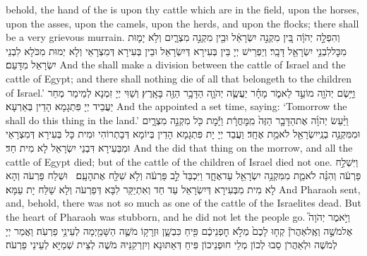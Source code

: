 {behold, the hand of the \lord\space is upon thy cattle which are in the field, upon the horses, upon the asses, upon the camels, upon the herds, and upon the flocks; there shall be a very grievous murrain.}{}
{וְהִפְלָ֣ה יְהֹוָ֔ה בֵּ֚ין מִקְנֵ֣ה יִשְׂרָאֵ֔ל וּבֵ֖ין מִקְנֵ֣ה מִצְרָ֑יִם וְלֹ֥א יָמ֛וּת מִכׇּל\maqqaf לִבְנֵ֥י יִשְׂרָאֵ֖ל דָּבָֽר׃}
{וְיַפְרֵישׁ יְיָ בֵּין בְּעִירָא דְּיִשְׂרָאֵל וּבֵין בְּעִירָא דְּמִצְרָאֵי וְלָא יְמוּת מִכֹּלָא לִבְנֵי יִשְׂרָאֵל מִדָּעַם׃}
{And the \lord\space shall make a division between the cattle of Israel and the cattle of Egypt; and there shall nothing die of all that belongeth to the children of Israel.’}{}
{וַיָּ֥שֶׂם יְהֹוָ֖ה מוֹעֵ֣ד לֵאמֹ֑ר מָחָ֗ר יַעֲשֶׂ֧ה יְהֹוָ֛ה הַדָּבָ֥ר הַזֶּ֖ה בָּאָֽרֶץ׃}
{וְשַׁוִּי יְיָ זִמְנָא לְמֵימַר מְחַר יַעֲבֵיד יְיָ פִּתְגָמָא הָדֵין בְּאַרְעָא׃}
{And the \lord\space appointed a set time, saying: ‘Tomorrow the \lord\space shall do this thing in the land.’}{}
{וַיַּ֨עַשׂ יְהֹוָ֜ה אֶת\maqqaf הַדָּבָ֤ר הַזֶּה֙ מִֽמׇּחֳרָ֔ת וַיָּ֕מׇת כֹּ֖ל מִקְנֵ֣ה מִצְרָ֑יִם וּמִמִּקְנֵ֥ה בְנֵֽי\maqqaf יִשְׂרָאֵ֖ל לֹא\maqqaf מֵ֥ת אֶחָֽד׃}
{וַעֲבַד יְיָ יָת פִּתְגָמָא הָדֵין בְּיוֹמָא דְּבָתְרוֹהִי וּמִית כָּל בְּעִירָא דְּמִצְרָאֵי וּמִבְּעִירָא דִּבְנֵי יִשְׂרָאֵל לָא מִית חַד׃}
{And the \lord\space did that thing on the morrow, and all the cattle of Egypt died; but of the cattle of the children of Israel died not one.}{}
{וַיִּשְׁלַ֣ח פַּרְעֹ֔ה וְהִנֵּ֗ה לֹא\maqqaf מֵ֛ת מִמִּקְנֵ֥ה יִשְׂרָאֵ֖ל עַד\maqqaf אֶחָ֑ד וַיִּכְבַּד֙ לֵ֣ב פַּרְעֹ֔ה וְלֹ֥א שִׁלַּ֖ח אֶת\maqqaf הָעָֽם׃ \petucha }
{וּשְׁלַח פַּרְעֹה וְהָא לָא מִית מִבְּעִירָא דְּיִשְׂרָאֵל עַד חַד וְאִתְיַקַּר לִבָּא דְּפַרְעֹה וְלָא שַׁלַּח יָת עַמָּא׃}
{And Pharaoh sent, and, behold, there was not so much as one of the cattle of the Israelites dead. But the heart of Pharaoh was stubborn, and he did not let the people go.}{}
{וַיֹּ֣אמֶר יְהֹוָה֮ אֶל\maqqaf מֹשֶׁ֣ה וְאֶֽל\maqqaf אַהֲרֹן֒ קְח֤וּ לָכֶם֙ מְלֹ֣א חׇפְנֵיכֶ֔ם פִּ֖יחַ כִּבְשָׁ֑ן וּזְרָק֥וֹ מֹשֶׁ֛ה הַשָּׁמַ֖יְמָה לְעֵינֵ֥י פַרְעֹֽה׃}
{וַאֲמַר יְיָ לְמֹשֶׁה וּלְאַהֲרֹן סַבוּ לְכוֹן מְלֵי חוּפְנֵיכוֹן פִּיחַ דְּאַתּוּנָא וְיִזְרְקִנֵּיהּ מֹשֶׁה לְצֵית שְׁמַיָּא לְעֵינֵי פַרְעֹה׃}

